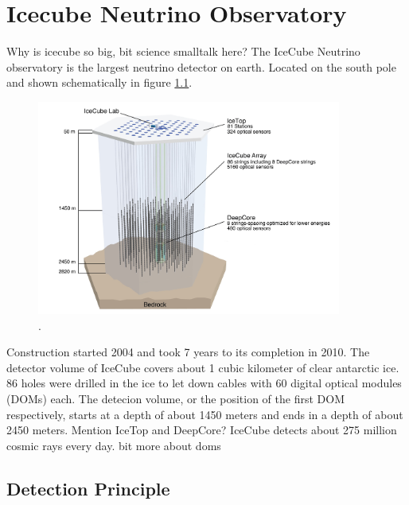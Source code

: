 \chapter{Icecube Neutrino Observatory}

Why is icecube so big, bit science smalltalk here?
The IceCube Neutrino observatory is the largest neutrino detector on earth.
Located on the south pole and shown schematically in figure \ref{fig:icecube}.

\begin{figure}
    \centering
    \includegraphics[width=10cm]{Plots/01_7_icecube/IceCube-Array.jpg}
    \caption{\cite{icecube_website}.}
    \label{fig:icecube}
\end{figure}

Construction started 2004 and took 7 years to its completion in 2010.
The detector volume of IceCube covers about 1 cubic kilometer of clear antarctic ice.
86 holes were drilled in the ice to let down cables with 60 digital optical modules (DOMs) each.
The detecion volume, or the position of the first DOM respectively, starts at a depth of about 1450 meters and ends in a depth of about 2450 meters.
Mention IceTop and DeepCore?
IceCube detects about 275 million cosmic rays every day.
bit more about doms


\section{Detection Principle}

